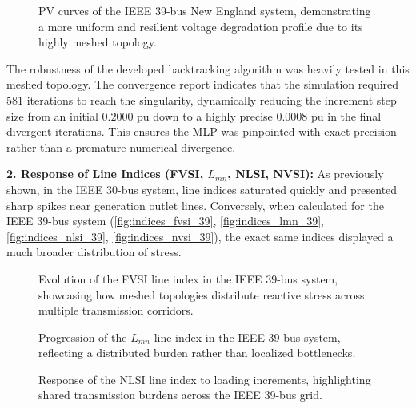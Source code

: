 \documentclass{ieeeaccess}
\begin{document}
\begin{figure}[htbp]
    \centering
    
    \caption{PV curves of the IEEE 39-bus New England system, demonstrating a more uniform and resilient voltage degradation profile due to its highly meshed topology.}
    \label{fig:curvapv_39}
\end{figure}

The robustness of the developed backtracking algorithm was heavily tested in this meshed topology. The convergence report indicates that the simulation required 581 iterations to reach the singularity, dynamically reducing the increment step size from an initial $0.2000$ pu down to a highly precise $0.0008$ pu in the final divergent iterations. This ensures the MLP was pinpointed with exact precision rather than a premature numerical divergence.

\textbf{2. Response of Line Indices (FVSI, $L_{mn}$, NLSI, NVSI):}
As previously shown, in the IEEE 30-bus system, line indices saturated quickly and presented sharp spikes near generation outlet lines. Conversely, when calculated for the IEEE 39-bus system (\autoref{fig:indices_fvsi_39}, \autoref{fig:indices_lmn_39}, \autoref{fig:indices_nlsi_39}, \autoref{fig:indices_nvsi_39}), the exact same indices displayed a much broader distribution of stress. 

\begin{figure}[htbp]
    \centering
    
    \caption{Evolution of the FVSI line index in the IEEE 39-bus system, showcasing how meshed topologies distribute reactive stress across multiple transmission corridors.}
    \label{fig:indices_fvsi_39}
\end{figure}

\begin{figure}[htbp]
    \centering
    
    \caption{Progression of the $L_{mn}$ line index in the IEEE 39-bus system, reflecting a distributed burden rather than localized bottlenecks.}
    \label{fig:indices_lmn_39}
\end{figure}

\begin{figure}[htbp]
    \centering
    
    \caption{Response of the NLSI line index to loading increments, highlighting shared transmission burdens across the IEEE 39-bus grid.}
    \label{fig:indices_nlsi_39}
\end{figure}
\end{document}
